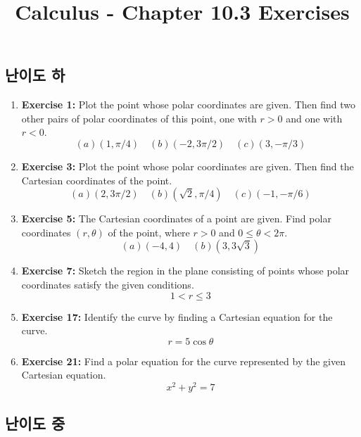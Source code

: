 \documentclass[12pt, a4paper]{article}
\title{Calculus - Chapter 10.3 Exercises}
\author{}
\date{}
\begin{document}
\maketitle
\hrulefill
\vspace{1em}

\subsection*{난이도 하}

\begin{enumerate}
    \item \textbf{Exercise 1:} Plot the point whose polar coordinates are given. Then find two other pairs of polar coordinates of this point, one with $r>0$ and one with $r<0$.
    \[ (a) (1, \pi/4) \quad (b) (-2, 3\pi/2) \quad (c) (3, -\pi/3) \]

    \item \textbf{Exercise 3:} Plot the point whose polar coordinates are given. Then find the Cartesian coordinates of the point.
    \[ (a) (2, 3\pi/2) \quad (b) (\sqrt{2}, \pi/4) \quad (c) (-1, -\pi/6) \]

    \item \textbf{Exercise 5:} The Cartesian coordinates of a point are given. Find polar coordinates $(r, \theta)$ of the point, where $r>0$ and $0 \le \theta < 2\pi$.
    \[ (a) (-4, 4) \quad (b) (3, 3\sqrt{3}) \]

    \item \textbf{Exercise 7:} Sketch the region in the plane consisting of points whose polar coordinates satisfy the given conditions.
    \[ 1 < r \le 3 \]

    \item \textbf{Exercise 17:} Identify the curve by finding a Cartesian equation for the curve.
    \[ r = 5\cos\theta \]

    \item \textbf{Exercise 21:} Find a polar equation for the curve represented by the given Cartesian equation.
    \[ x^2 + y^2 = 7 \]
\end{enumerate}

\hrulefill
\vspace{1em}

\subsection*{난이도 중}
\end{document}
